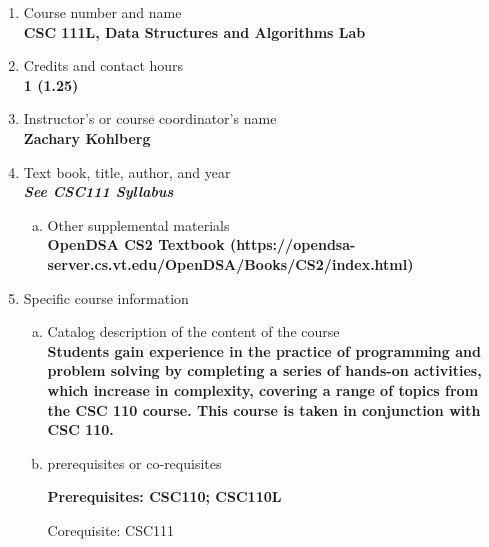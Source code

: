 \label{CSC111L}  %
\begin{enumerate}[1.]
\item Course number and name\\
  {\bfseries
CSC 111L, Data Structures and Algorithms Lab
  }

\item Credits and contact hours\\
  {\bfseries
1 (1.25)
  }

\item Instructor's or course coordinator's name\\
  {\bfseries
Zachary Kohlberg
  }

\item Text book, title, author, and year\\
  {\bfseries
    \emph{See CSC111 Syllabus}
  }
\begin{enumerate}[a.]
\item Other supplemental materials\\
  {\bfseries
    OpenDSA CS2 Textbook (https://opendsa-server.cs.vt.edu/OpenDSA/Books/CS2/index.html)
  }
\end{enumerate}

\item Specific course information
\begin{enumerate}[a.]
\item Catalog description of the content of the course\\
  {\bfseries
Students gain experience in the practice of programming and problem solving by
completing a series of hands-on activities, which increase in complexity, covering a range of topics from the
CSC 110 course. This course is taken in conjunction with CSC 110.
  }

\item prerequisites or co-requisites\\
  {\bfseries
    Prerequisites: CSC110; CSC110L

    Corequisite: CSC111
  }


\end{enumerate}
\end{enumerate}
